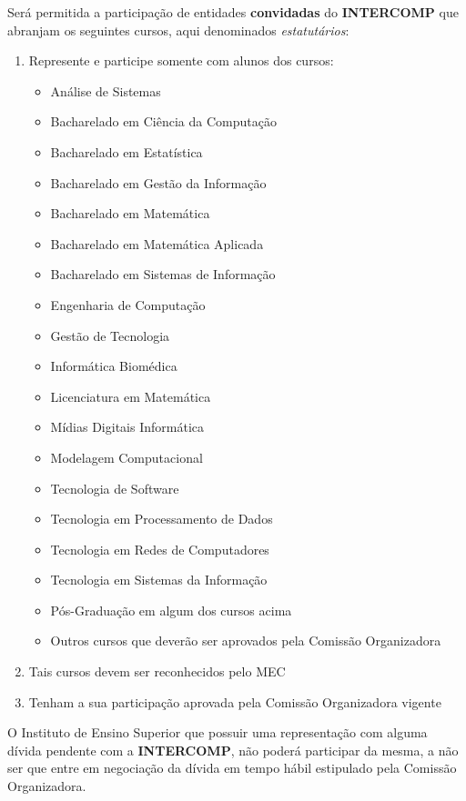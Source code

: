 \begin{article}
	\begin{xparagraph}
		Será permitida a participação de entidades \textbf{convidadas} do \textbf{INTERCOMP} que abranjam os seguintes cursos, aqui denominados \textit{estatutários}:
		\begin{enumerate}[noitemsep,leftmargin=2\parindent]
			\item Represente e participe somente com alunos dos cursos:
			\begin{itemize}[noitemsep]
				\item Análise de Sistemas
				\item Bacharelado em Ciência da Computação
				\item Bacharelado em Estatística
				\item Bacharelado em Gestão da Informação
				\item Bacharelado em Matemática
				\item Bacharelado em Matemática Aplicada
				\item Bacharelado em Sistemas de Informação
				\item Engenharia de Computação
				\item Gestão de Tecnologia
				\item Informática Biomédica
				\item Licenciatura em Matemática
				\item Mídias Digitais Informática
				\item Modelagem Computacional
				\item Tecnologia de Software
				\item Tecnologia em Processamento de Dados
				\item Tecnologia em Redes de Computadores
				\item Tecnologia em Sistemas da Informação
				\item Pós-Graduação em algum dos cursos acima
				\item Outros cursos que deverão ser aprovados pela Comissão Organizadora
			\end{itemize}

			\item Tais cursos devem ser reconhecidos pelo MEC
			\item Tenham a sua participação aprovada pela Comissão Organizadora vigente
		\end{enumerate}
	\end{xparagraph}

	\begin{xparagraph}
		O Instituto de Ensino Superior que possuir uma representação com alguma dívida pendente com a \textbf{INTERCOMP}, não poderá participar da mesma, a não ser que entre em negociação da dívida em tempo hábil estipulado pela Comissão Organizadora.
	\end{xparagraph}


\end{article}
